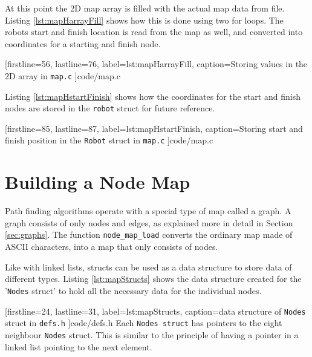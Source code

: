 \newpage
At this point the 2D map array is filled with the actual map data from file.
Listing \ref{lst:mapHarrayFill} shows how this is done using two for loops.
The robots start and finish location is read from the map as well,
and converted into coordinates for a starting and finish node.


[firstline=56,			%
lastline=76,			%
label=lst:mapHarrayFill,	%
caption={Storing values in the 2D array in {\tt map.c}}
]{code/map.c}

Listing \ref{lst:mapHstartFinish} shows how the coordinates for the start and finish nodes are stored in the {\tt robot} struct for future reference. 


[firstline=85,			%
lastline=87,			%
label=lst:mapHstartFinish,	%
caption={Storing start and finish position in the {\tt Robot} struct in {\tt map.c}}
]{code/map.c}

\newpage

\section{Building a Node Map}
\label{sec:map_node} %
Path finding algorithms operate with a special type of map called a graph.
A graph consists of only nodes and edges, as explained more in detail in Section \ref{sec:graphs}.
The function {\tt node\_map\_load} converts the ordinary map made of ASCII characters, into a map that only consists of nodes.

Like with linked lists, structs can be used as a data structure to store data of different types. 
Listing \ref{lst:mapStructs} shows the data structure created for the '{\tt Nodes} struct' to hold all the necessary data for the individual nodes.


[firstline=24,			%
lastline=31,			%
label=lst:mapStructs,	%
caption={data structure of {\tt Nodes} struct in {\tt defs.h}}
]{code/defs.h}
Each {\tt Nodes struct} has pointers to the eight neighbour {\tt Nodes} struct.
This is similar to the principle of having a pointer in a linked list pointing to the next element.

